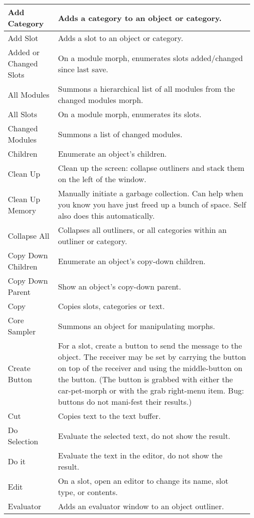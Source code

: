 \documentclass[letterpaper,10pt,english]{sphinxmanual}
\begin{document}
\begin{longtable}{p{5cm} p{10cm}}
Add Category
&
Adds a category to an object or category.
\\
\hline
Add Slot
&
Adds a slot to an object or category.
\\
\hline
Added or Changed Slots
&
On a module morph, enumerates slots added/changed since last save.
\\
\hline
All Modules
&
Summons a hierarchical list of all modules from the changed modules morph.
\\
\hline
All Slots
&
On a module morph, enumerates its slots.
\\
\hline
Changed Modules
&
Summons a list of changed modules.
\\
\hline
Children
&
Enumerate an object’s children.
\\
\hline
Clean Up
&
Clean up the screen: collapse outliners and stack them on the left of the window.
\\
\hline
Clean Up Memory
&
Manually initiate a garbage collection. Can help when you know you have just freed up a bunch of space. Self also does this automatically.
\\
\hline
Collapse All
&
Collapses all outliners, or all categories within an outliner or category.
\\
\hline
Copy Down Children
&
Enumerate an object’s copy-down children.
\\
\hline
Copy Down Parent
&
Show an object’s copy-down parent.
\\
\hline
Copy
&
Copies slots, categories or text.
\\
\hline
Core Sampler
&
Summons an object for manipulating morphs.
\\
\hline
Create Button
&
For a slot, create a button to send the message to the object. The receiver may be set by carrying the button on top of the receiver and using the middle-button on the button. (The button is grabbed with either the car-pet-morph or with the grab right-menu item. Bug: buttons do not mani-fest their results.)
\\
\hline
Cut
&
Copies text to the text buffer.
\\
\hline
Do Selection
&
Evaluate the selected text, do not show the result.
\\
\hline
Do it
&
Evaluate the text in the editor, do not show the result.
\\
\hline
Edit
&
On a slot, open an editor to change its name, slot type, or contents.
\\
\hline
Evaluator
&
Adds an evaluator window to an object outliner.
\\

\end{longtable}
\end{document}
